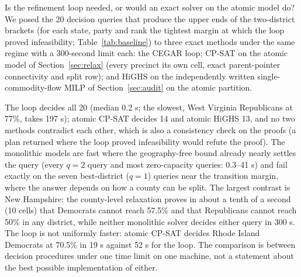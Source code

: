 Is the refinement loop needed, or would an exact solver on the atomic model do? We posed the 20 decision queries that produce the upper ends of the two-district brackets (for each state, party and rank the tightest margin at which the loop proved infeasibility; Table~\ref{tab:baseline}) to three exact methods under the same regime with a 300-second limit each: the CEGAR loop; CP-SAT on the atomic model of Section~\ref{sec:relax} (every precinct its own cell, exact parent-pointer connectivity and split row); and HiGHS on the independently written single-commodity-flow MILP of Section~\ref{sec:audit} on the atomic partition.

\begin{table}[!tbp]
\centering\footnotesize
\caption{Decision queries (``$q$ districts with share at least $m$?'', all answered ``no'' by the loop) posed to the CEGAR loop and to two monolithic exact solvers on the atomic model, 300 s limit, five CP-SAT workers (HiGHS: default threads). ``proof'' = proved infeasible; ``unknown'' = undecided at the limit. No solver returned a plan for a query that another proved infeasible.}\label{tab:baseline}
\end{table}

The loop decides all 20 (median 0.2 s; the slowest, West Virginia Republicans at 77\%, takes 197 s); atomic CP-SAT decides 14 and atomic HiGHS 13, and no two methods contradict each other, which is also a consistency check on the proofs (a plan returned where the loop proved infeasibility would refute the proof). The monolithic models are fast where the geography-free bound already nearly settles the query (every $q=2$ query and most zero-capacity queries: 0.3--41 s) and fail exactly on the seven best-district ($q=1$) queries near the transition margin, where the answer depends on how a county can be split. The largest contrast is New Hampshire: the county-level relaxation proves in about a tenth of a second (10 cells) that Democrats cannot reach 57.5\% and that Republicans cannot reach 50\% in any district, while neither monolithic solver decides either query in 300 s. The loop is not uniformly faster: atomic CP-SAT decides Rhode Island Democrats at 70.5\% in 19 s against 52 s for the loop. The comparison is between decision procedures under one time limit on one machine, not a statement about the best possible implementation of either.

